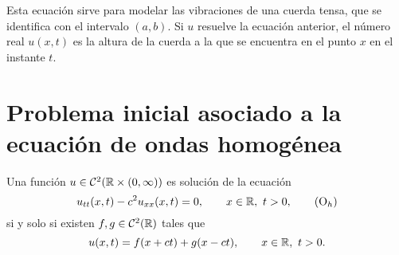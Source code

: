 \documentclass[a4paper, 12pt, extrafontsizes]{memoir}
\begin{document}
Esta ecuación sirve para modelar las vibraciones de una cuerda tensa, que se identifica con el intervalo $(a,b)$. Si $u$ resuelve la ecuación anterior, el número real $u(x,t)$ es la altura de la cuerda a la que se encuentra en el punto $x$ en el instante $t$.

\section{Problema inicial asociado a la ecuación de ondas homogénea}

\begin{theorem}\label{teo:3.0.2}
    Una función $u \in \mathcal{C}^2(\mathbb R \times (0,\infty))$ es solución de la ecuación
    \[u_{tt}(x,t) - c^2u_{xx}(x,t) = 0, \qquad x \in \R, \ t >0, \tag{$\textup{O}_h$}\]
    si y solo si existen $f,g \in \mathcal{C}^2(\mathbb R)$ tales que
    \[u(x,t)=f(x+ct)+g(x-ct), \qquad x \in \mathbb R, \ t > 0.\]
\end{theorem}
\end{document}
